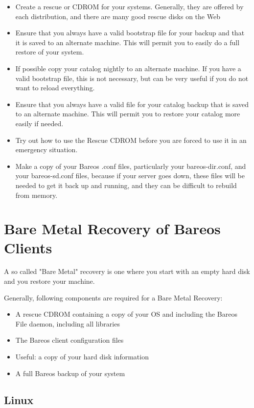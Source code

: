 \begin{itemize}
\item Create a rescue or CDROM for your systems. Generally,
   they are offered by each distribution, and there are many good
   rescue disks on the Web
\item Ensure that you always have a valid bootstrap file for your backup and
   that it is saved to an alternate machine.  This will permit you to
   easily do a full restore of your system.
\item If possible copy your catalog nightly to an alternate machine.  If you
   have a valid bootstrap file, this is not necessary, but  can be very useful if
   you do not want to reload everything.
\item Ensure that you always have a valid  file for your  catalog
   backup that is saved to an alternate machine. This will  permit you to restore
   your catalog more easily if needed.
\item Try out how to use the Rescue CDROM before you are forced to use it
    in an emergency situation.
\item Make a copy of your Bareos .conf files, particularly your
   bareos-dir.conf, and your bareos-sd.conf files, because if your server
   goes down, these files will be needed to get it back up and running,
   and they can be difficult to rebuild from memory.
\end{itemize}


\section{Bare Metal Recovery of Bareos Clients}
\label{sec:BareMetalRestoreClient}

A so called "Bare Metal" recovery is one where you start with an empty hard
disk and you restore your machine.

Generally, following components are required for a Bare Metal Recovery:
\begin{itemize}
\item A rescue CDROM containing a copy of your OS and including the Bareos File daemon, including all libraries
\item The Bareos client configuration files
\item Useful: a copy of your hard disk information
\item A full Bareos backup of your system
\end{itemize}


\subsection{Linux}
\label{sec:rear}

